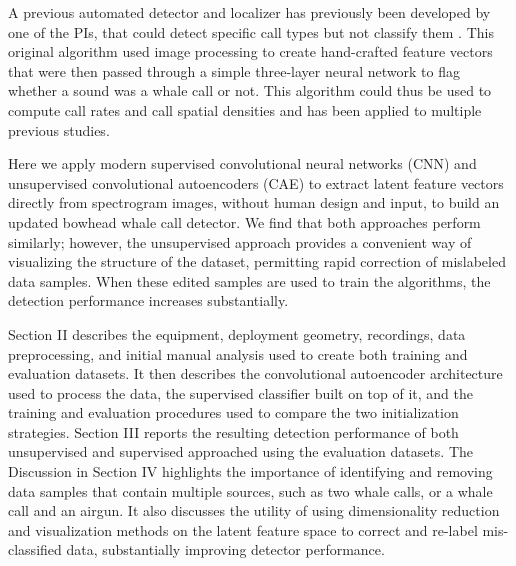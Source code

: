 \documentclass[preprint,NumberedRefs]{JASAnew}
\begin{document}
A previous automated detector and localizer has previously been developed by one of the PIs, that could detect specific call types but not classify them \cite{thode2012automated}.  This original algorithm used image processing to create hand-crafted feature vectors that were then passed through a simple three-layer neural network to flag whether a sound was a whale call or not.  This algorithm could thus be used to compute call rates and call spatial densities and has been applied to multiple previous studies\cite{thode2016source,thode2017decadal,thode2020roaring,thode2024statistical,blackwell2015effects}.  


Here we apply modern supervised convolutional neural networks (CNN) and unsupervised convolutional autoencoders (CAE) \cite{guo2017deep,ozanich2021deep} to extract latent feature vectors directly from spectrogram images, without human design and input, to build an updated bowhead whale call detector.  We find that both approaches perform similarly; however, the unsupervised approach provides a convenient way of visualizing the structure of the dataset, permitting rapid correction of mislabeled data samples.  When these edited samples are used to train the algorithms, the detection performance increases substantially.



Section II describes the equipment, deployment geometry, recordings, data preprocessing, and initial manual analysis used to create both training and evaluation datasets.  It then describes the convolutional autoencoder architecture used to process the data, the supervised classifier built on top of it, and the training and evaluation procedures used to compare the two initialization strategies.  Section III reports the resulting detection performance of both unsupervised and supervised approached using the evaluation datasets.  The Discussion in Section IV highlights the importance of identifying and removing data samples that contain multiple sources, such as two whale calls, or a whale call and an airgun.  It also discusses the utility of using dimensionality reduction and visualization methods on the latent feature space to correct and re-label mis-classified data, substantially improving detector performance. 

\end{document}

